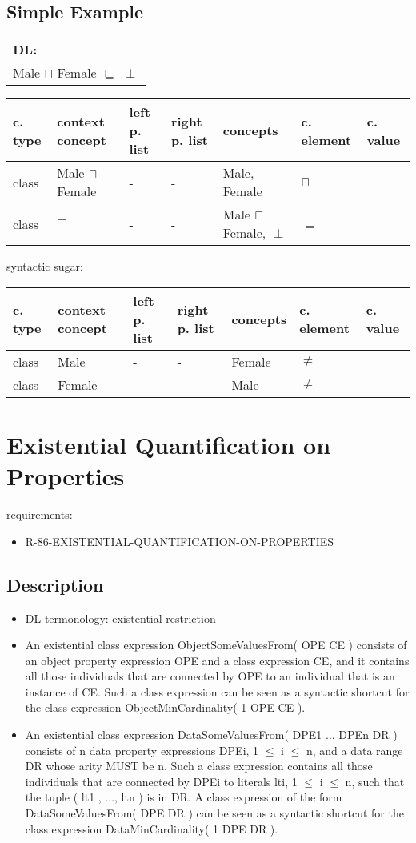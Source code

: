 \documentclass{llncs}
\newenvironment{gcotable}{
  \scriptsize
  \sffamily
  \vspace{0.3cm}
  \begin{tabular}{l|l|l|l|l|l|l}
  \hline
  \textbf{c. type} & \textbf{context concept} & \textbf{left p. list} & \textbf{right p. list} & \textbf{concepts} & \textbf{c. element} & \textbf{c. value} \\
  \hline

}{
  \hline
  \end{tabular}
  \linebreak
}
\newenvironment{DL}{
  \scriptsize
  \sffamily
  \vspace{0.3cm}
  \begin{tabular}{l}
	\textbf{DL:} \\

}{
  \end{tabular}
  \linebreak
}
\begin{document}
\subsection{Simple Example}

\begin{DL}
Male $\sqcap$ Female $\sqsubseteq$ $\perp$
\end{DL}

\begin{gcotable}
class & Male $\sqcap$ Female & - & - & Male, Female & $\sqcap$  \\
class & $\top$ & - & - & Male $\sqcap$ Female, $\perp$ & $\sqsubseteq$ \\
\end{gcotable}

syntactic sugar:

\begin{gcotable}
class & Male & - & - & Female & $\ne$ \\
class & Female & - & - & Male & $\ne$ \\
\end{gcotable}

\section{Existential Quantification on Properties}

requirements:

\begin{itemize}
	\item R-86-EXISTENTIAL-QUANTIFICATION-ON-PROPERTIES
\end{itemize}

\subsection{Description}

\begin{itemize}
	\item DL termonology: existential restriction
	\item An existential class expression ObjectSomeValuesFrom( OPE CE ) consists of an object property expression OPE and a class expression CE, and it contains all those individuals that are connected by OPE to an individual that is an instance of CE. Such a class expression can be seen as a syntactic shortcut for the class expression ObjectMinCardinality( 1 OPE CE ).
	\item An existential class expression DataSomeValuesFrom( DPE1 ... DPEn DR ) consists of n data property expressions DPEi, 1 $\leq$ i $\leq$ n, and a data range DR whose arity MUST be n. Such a class expression contains all those individuals that are connected by DPEi to literals lti, 1 $\leq$ i $\leq$ n, such that the tuple ( lt1 , ..., ltn ) is in DR. A class expression of the form DataSomeValuesFrom( DPE DR ) can be seen as a syntactic shortcut for the class expression DataMinCardinality( 1 DPE DR ). 
\end{itemize}
\end{document}
